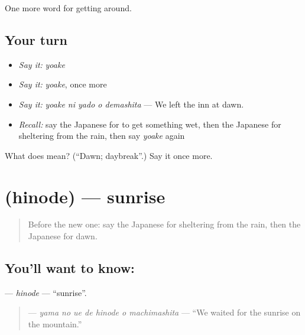 \begin{grammarlens}[title={What you've built}]
One more word for getting around.
\end{grammarlens}

\subsection*{Your turn}
\begin{itemize}
\raggedright
  \item \emph{Say it:} \emph{yoake}
  \item \emph{Say it:} \emph{yoake}, once more
  \item \emph{Say it:} \emph{yoake ni yado o demashita} — We left the inn at dawn.
  \item \emph{Recall:} say the Japanese for to get something wet, then the Japanese for sheltering from the rain, then say \emph{yoake} again
\end{itemize}

\begin{tcolorbox}[breakable,colback=teal!4,colframe=teal!35!black,title={Before you move on}]
What does  mean? (\textquotedblleft{}Dawn; daybreak\textquotedblright{}.) Say it once more.
\end{tcolorbox}
\section[\texorpdfstring{\ja{ひので} (hinode)}{ひので (hinode)}]{ (hinode) — sunrise}

\label{lesson:JA-C416-hinode}



\begin{quote}
Before the new one: say the Japanese for sheltering from the rain, then the Japanese for dawn.
\end{quote}

\subsection*{You'll want to know: }
\textbf{} — \emph{hinode} — \textquotedblleft{}sunrise\textquotedblright{}.

\begin{quote}
\textbf{   } — \emph{yama no ue de hinode o machimashita} — \textquotedblleft{}We waited for the sunrise on the mountain.\textquotedblright{}
\end{quote}

